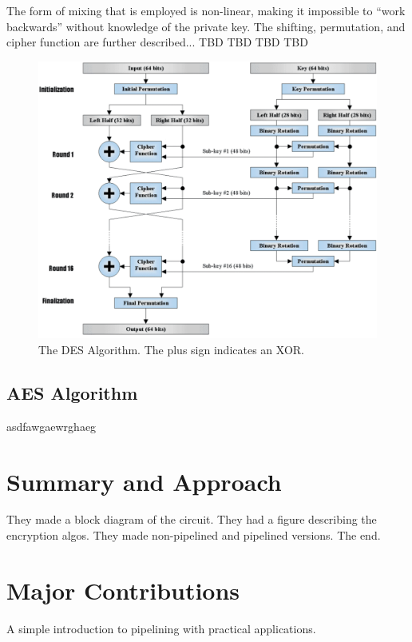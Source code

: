 \documentclass[journal,twocolumn]{IEEEtran}
\begin{document}
The form of mixing that is employed is non-linear, making it impossible to 
``work backwards'' without knowledge of the private key. The shifting, 
permutation, and cipher function are further described... TBD TBD TBD TBD

\begin{figure}
\begin{center}
\includegraphics[scale=0.4]{des_algo.png}
\caption{The DES Algorithm. The plus sign indicates an XOR.}
\label{fig_des_algo}
\end{center}
\end{figure}

\subsection{AES Algorithm}

asdfawgaewrghaeg

\section{Summary and Approach}

They made a block diagram of the circuit. They had a figure describing the 
encryption algos. They made non-pipelined and pipelined versions. The end.

\section{Major Contributions}

A simple introduction to pipelining with practical applications.
\end{document}
